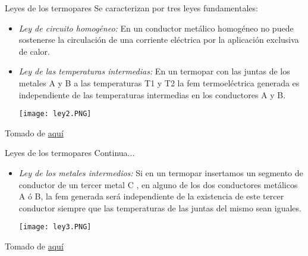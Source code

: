 \documentclass[aspectratio=169]{beamer}
\begin{document}
\begin{frame}{Leyes de los termopares}
    Se caracterizan por tres leyes fundamentales:\\[8pt]
    \begin{itemize}
        \item \emph{Ley de circuito homogéneo: } En un conductor metálico homogéneo no puede sostenerse la circulación de una corriente eléctrica por la aplicación exclusiva de calor.
        \item \emph{Ley de las temperaturas intermedias: } En un termopar con las juntas de los metales A y B a las temperaturas T1 y T2 la fem termoeléctrica generada es independiente de las temperaturas intermedias en los conductores A y B.
        \begin{center}
            \texttt{[image: ley2.PNG]}
        \end{center}
    \end{itemize}
    \tiny{Tomado de \href{http://laboratorios.fi.uba.ar/lscm/termocuplas01.pdf}{aquí}}
\end{frame}
\begin{frame}{Leyes de los termopares}
    Continua...\\[8pt]
    \begin{itemize}
        \item \emph{Ley de los metales intermedios: } Si en un termopar insertamos un segmento de conductor de un tercer metal C , en alguno de los dos conductores metálicos A ó B, la fem generada será independiente de la existencia de este tercer conductor siempre que las temperaturas de las juntas del mismo sean iguales. 
        \begin{center}
            \texttt{[image: ley3.PNG]}
        \end{center}
    \end{itemize}
    \tiny{Tomado de \href{http://laboratorios.fi.uba.ar/lscm/termocuplas01.pdf}{aquí}}
\end{frame}
\end{document}
